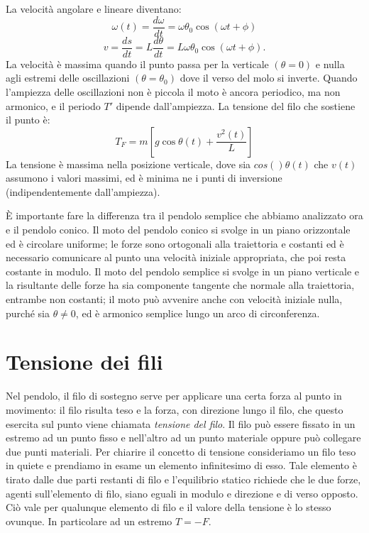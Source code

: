 \documentclass[class=book, crop=false, oneside, 12pt]{standalone}
\begin{document}
La velocità angolare e lineare diventano:
\begin{equation}
    \omega (t) = \frac{d \omega}{dt} = \omega \theta_0 \cos (\omega t + \phi)
\end{equation}
\begin{equation}
    v = \frac{d s}{dt} = L \frac{d \theta}{ dt} = L \omega \theta_0 \cos (\omega t +\phi).
\end{equation}
La velocità è massima quando il punto passa per la verticale \((\theta = 0)\) e nulla agli estremi delle oscillazioni \((\theta= \theta_0)\) dove il verso del molo si inverte.\newline
Quando l'ampiezza delle oscillazioni non è piccola il moto è ancora periodico, ma non armonico, e il periodo \(T'\) dipende dall'ampiezza.\newline
La tensione del filo che sostiene il punto è:
\begin{equation}
    T_F = m [ g \cos \theta(t) + \frac{v^2(t)}{L} ]
\end{equation}
La tensione è massima nella posizione verticale, dove sia \(cos() \theta (t)\) che \(v(t)\) assumono i valori massimi, ed è minima ne i punti di inversione (indipendentemente dall'ampiezza). 

È importante fare la differenza tra il pendolo semplice che abbiamo analizzato ora e il pendolo conico.
Il moto del pendolo conico si svolge in un piano orizzontale ed è circolare uniforme; le forze sono ortogonali alla traiettoria e costanti ed è necessario comunicare al punto una velocità iniziale appropriata, che poi resta costante in modulo. 
Il moto del pendolo semplice si svolge in un piano verticale e la risultante delle forze ha sia componente tangente che normale alla traiettoria, entrambe non costanti; il moto può avvenire anche con velocità iniziale nulla, purché sia \(\theta \neq 0\), ed è armonico semplice lungo un arco di circonferenza.

\section{Tensione dei fili}

Nel pendolo, il filo di sostegno serve per applicare una certa forza al punto in movimento: il filo risulta teso e la forza, con direzione lungo il filo, che questo esercita sul punto viene chiamata \emph{tensione del filo}. Il filo può essere fissato in un estremo ad un punto fisso e nell'altro ad un punto materiale oppure può collegare due punti materiali.\newline
Per chiarire il concetto di tensione consideriamo un filo teso in quiete e prendiamo in esame un elemento infinitesimo di esso. Tale elemento è tirato dalle due parti restanti di filo e l'equilibrio statico richiede che le due forze, agenti sull'elemento di filo, siano eguali in modulo e direzione e di verso opposto.\newline
Ciò vale per qualunque elemento di filo e il valore della tensione è lo stesso ovunque. In particolare ad un estremo \(T = -F\).
\end{document}
